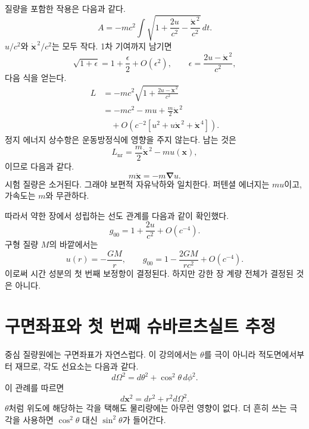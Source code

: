 질량을 포함한 작용은 다음과 같다.
\begin{equation}
A=-mc^2\int
\sqrt{1+\frac{2u}{c^2}
-\frac{\dot{\mathbf{x}}^{\,2}}{c^2}}\,dt.
\label{eq:l5-weak-action}
\end{equation}
\(u/c^2\)와 \(\dot{\mathbf{x}}^{\,2}/c^2\)는 모두 작다. 1차 기여까지 남기면
\begin{equation}
\sqrt{1+\epsilon}
=1+\frac{\epsilon}{2}+O(\epsilon^2),
\qquad
\epsilon=\frac{2u-\dot{\mathbf{x}}^{\,2}}{c^2},
\end{equation}
다음 식을 얻는다.
\begin{align}
L
&=-mc^2
\sqrt{1+\frac{2u-\dot{\mathbf{x}}^{\,2}}{c^2}}\\
&=-mc^2-mu+\frac{m}{2}\dot{\mathbf{x}}^{\,2}\\
&\quad+O\!\left(c^{-2}
 [u^2+u\dot{\mathbf{x}}^{\,2}+\dot{\mathbf{x}}^{\,4}]\right).
\label{eq:l5-newton-expansion}
\end{align}
정지 에너지 상수항은 운동방정식에 영향을 주지 않는다. 남는 것은
\begin{equation}
L_{\mathrm{nr}}
=\frac{m}{2}\dot{\mathbf{x}}^{\,2}-m u(\mathbf{x}),
\label{eq:l5-newton-lagrangian}
\end{equation}
이므로 다음과 같다.
\begin{equation}
m\ddot{\mathbf{x}}=-m\boldsymbol{\nabla}u.
\label{eq:l5-newton-equation}
\end{equation}
시험 질량은 소거된다. 그래야 보편적 자유낙하와 일치한다. 퍼텐셜 에너지는 \(m u\)이고, 가속도는 \(m\)와 무관하다.

따라서 약한 장에서 성립하는 선도 관계를 다음과 같이 확인했다.
\begin{equation}
g_{00}=1+\frac{2u}{c^2}+O(c^{-4}).
\label{eq:l5-g00-newton}
\end{equation}
구형 질량 \(M\)의 바깥에서는
\begin{equation}
u(r)=-\frac{GM}{r},
\qquad
g_{00}=1-\frac{2GM}{rc^2}+O(c^{-4}).
\label{eq:l5-g00-spherical}
\end{equation}
이로써 시간 성분의 첫 번째 보정항이 결정된다. 하지만 강한 장 계량 전체가 결정된 것은 아니다.

\section{구면좌표와 첫 번째 슈바르츠실트 추정}

중심 질량원에는 구면좌표가 자연스럽다. 이 강의에서는 \(\theta\)를 극이 아니라 적도면에서부터 재므로, 각도 선요소는 다음과 같다.
\begin{equation}
d\Omega^2=d\theta^2+\cos^2\theta\,d\phi^2.
\label{eq:l5-angular-metric}
\end{equation}
이 관례를 따르면
\begin{equation}
d\mathbf{x}^2=dr^2+r^2d\Omega^2.
\label{eq:l5-flat-spherical}
\end{equation}
\(\theta\)처럼 위도에 해당하는 각을 택해도 물리량에는 아무런 영향이 없다. 더 흔히 쓰는 극각을 사용하면 \(\cos^2\theta\) 대신
\(\sin^2\theta\)가 들어간다.

